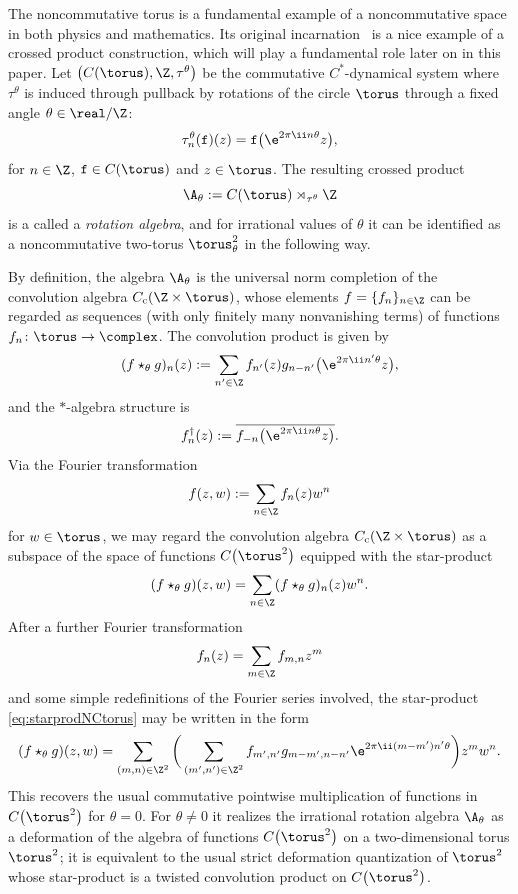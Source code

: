 \begin{Example}\label{ex:NCtori}
The noncommutative torus is a fundamental example
of a noncommutative space in both physics and mathematics. Its
original incarnation~\cite{Rieffel1981} is a nice example of a crossed
product construction, which will play a fundamental role later on in this
paper. Let $\big(C(\torus),\Z,\tau^\theta\big)$ be the commutative $C^*$-dynamical system
where $\tau^\theta$ is induced through pullback by rotations of the circle $\torus$ through
a fixed angle $\theta\in\real/\Z$:
\[
\tau^\theta_n(\mathtt{f})(z) = \mathtt{f}\big(\e^{2\pi\ii n \theta} z\big) ,
\]
for $n\in\Z$, $\mathtt{f}\in C(\torus)$ and $z\in\torus$. The resulting crossed
product
\[
\A_\theta:=C(\torus)\rtimes_{\tau^\theta}\Z
\]
is a called a \emph{rotation
algebra}, and for irrational values of $\theta$ it can be identified as a noncommutative two-torus
$\torus_\theta^2$ in the following way.

By definition, the algebra
$\A_\theta$ is the universal norm completion of the convolution
algebra $C_{\rm c}(\Z\times\torus)$, whose elements $f=\{f_n\}_{n\in\Z}$ can be regarded as
sequences (with only finitely many nonvanishing
terms) of functions $f_n\colon \torus\to\complex$. The convolution product is
given by
\[
(f\star_\theta g)_n(z) := \sum_{n'\in\Z} f_{n'}(z) g_{n-n'}\big(\e^{2\pi\ii n' \theta} z\big) ,
\]
and the $*$-algebra structure is
\[
f^\dag_n(z):=\overline{f_{-n}\big(\e^{2\pi\ii n \theta} z\big)} .
\]
Via the Fourier transformation
\[
f(z,w) := \sum_{n\in\Z} f_{n}(z) w^n
\]
for $w\in\torus$, we may regard the convolution algebra $C_{\rm
 c}(\Z\times\torus)$ as a subspace of the space of functions $C\big(\torus^2\big)$ equipped
with the star-product
\begin{gather}\label{eq:starprodNCtorus}
(f\star_\theta g)(z,w) = \sum_{n\in\Z} (f\star_\theta g)_n(z) w^n .
\end{gather}
After a further Fourier transformation
\[
f_n(z) = \sum_{m\in\Z} f_{m,n} z^m
\]
and some simple redefinitions of the Fourier series involved, the
star-product \eqref{eq:starprodNCtorus} may be written in the form
\[
(f\star_\theta g)(z,w) = \sum_{(m,n)\in\Z^2}
\bigg(\sum_{(m',n')\in\Z^2} f_{m',n'} g_{m-m',n-n'}
\e^{2\pi\ii (m-m') n' \theta}\bigg) z^m w^n .
\]
This recovers the usual commutative pointwise multiplication of functions in
$C\big(\torus^2\big)$ for $\theta=0$. For $\theta\neq0$ it realizes the irrational rotation algebra $\A_\theta$ as a
deformation of the algebra of functions $C\big(\torus^2\big)$ on a
two-dimensional torus $\torus^2$; it is equivalent to the usual strict
deformation quantization of $\torus^2$ whose star-product is a twisted
convolution product on $C\big(\torus^2\big)$.


\end{Example}

